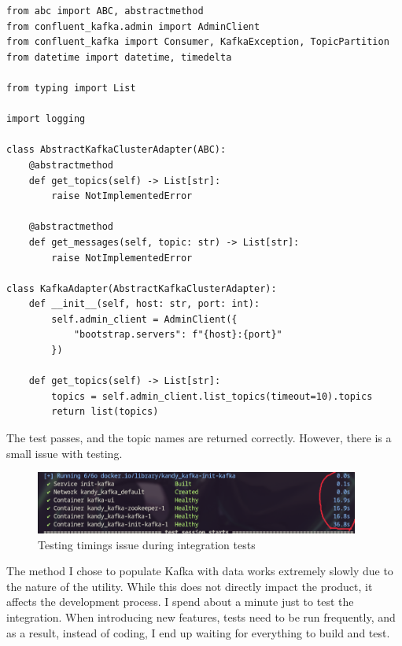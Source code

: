 \documentclass[10pt , a4paper]{report}
\newenvironment{code}{\captionsetup{type=listing}}{}
\begin{document}
\newpage
\begin{code}
  \begin{verbatim}
from abc import ABC, abstractmethod
from confluent_kafka.admin import AdminClient
from confluent_kafka import Consumer, KafkaException, TopicPartition
from datetime import datetime, timedelta

from typing import List

import logging 

class AbstractKafkaClusterAdapter(ABC):
    @abstractmethod
    def get_topics(self) -> List[str]:
        raise NotImplementedError

    @abstractmethod
    def get_messages(self, topic: str) -> List[str]:
        raise NotImplementedError

class KafkaAdapter(AbstractKafkaClusterAdapter):
    def __init__(self, host: str, port: int):
        self.admin_client = AdminClient({
            "bootstrap.servers": f"{host}:{port}"
        })
    
    def get_topics(self) -> List[str]:
        topics = self.admin_client.list_topics(timeout=10).topics
        return list(topics)
  \end{verbatim}
\end{code}

The test passes, and the topic names are returned correctly. However, there is a small issue with testing.

\begin{figure}[htbp]
  \begin{center}
    \includegraphics[width=0.95\textwidth]{imgs/TestingTimings.png}
  \end{center}
  \caption{Testing timings issue during integration tests}\label{fig:}
\end{figure}

The method I chose to populate Kafka with data works extremely slowly due to the nature of the utility. While this does not directly impact the product, it affects the development process. I spend about a minute just to test the integration. When introducing new features, tests need to be run frequently, and as a result, instead of coding, I end up waiting for everything to build and test.
\end{document}

